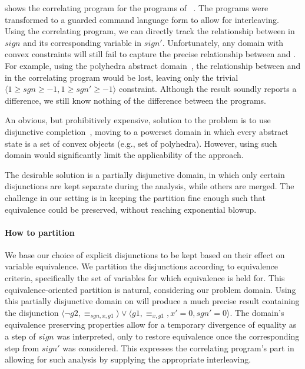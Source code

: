 

 shows the correlating program for the programs of ~. The programs were transformed to a guarded command language form to allow for interleaving. Using the correlating program, we can directly track the relationship between  in $sign$ and its corresponding variable  in $sign'$. Unfortunately, any domain with convex constraints will still fail to capture the precise relationship between  and . For example, using the polyhedra abstract domain~\cite{TODO}, the relationship between  and  in the correlating program would be lost, leaving only the trivial $\langle 1 \geq sgn \geq -1, 1 \geq sgn' \geq -1 \rangle$ constraint. Although the result soundly reports a difference, we still know nothing of the difference between the programs.

An obvious, but prohibitively expensive, solution to the problem is to use disjunctive completion~\cite{TODO}, moving to a powerset domain in which every abstract state is a set of convex objects (e.g., set of polyhedra). However, using such domain would significantly limit the applicability of the approach.

The desirable solution is a partially disjunctive domain, in which only certain disjunctions are kept separate during the analysis, while others are merged. The challenge in our setting is in keeping the partition fine enough such that equivalence could be preserved, without reaching exponential blowup.

\paragraph{How to partition}
We base our choice of explicit disjunctions to be kept based on their effect on variable equivalence. We partition the disjunctions according to equivalence criteria, specifically the set of variables for which equivalence is held for. This equivalence-oriented partition is natural, considering our problem domain. Using this partially disjunctive domain on  will produce a much precise result containing the disjunction $\langle \neg g2, \equiv_{sgn,x,g1} \rangle \vee \langle g1, \equiv_{x,g1}, x' = 0, sgn' = 0 \rangle$. The domain's equivalence preserving properties allow for a temporary divergence of equality as a step of $sign$ was interpreted, only to restore equivalence once the corresponding step from $sign'$ was considered. This expresses the correlating program's part in allowing for such analysis by supplying the appropriate interleaving.


